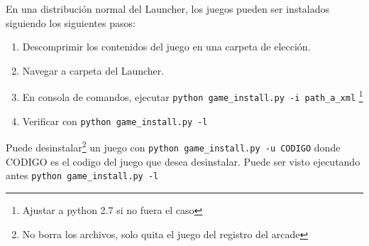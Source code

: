 \documentclass[language=spanish]{article}
\begin{document}
En una distribución normal del Launcher, los juegos pueden ser instalados siguiendo los siguientes pasos:\\
\begin{enumerate}
	\item Descomprimir los contenidos del juego en una carpeta de elección.
	\item Navegar a carpeta del Launcher.
	\item En consola de comandos, ejecutar {\tt python game\_install.py -i path\_a\_xml} \footnote{Ajustar a python 2.7 si no fuera el caso}
	\item Verificar con {\tt python game\_install.py -l}
\end{enumerate}
Puede desinstalar\footnote{No borra los archivos, solo quita el juego del registro del arcade} un juego con {\tt python game\_install.py -u CODIGO} donde CODIGO es el codigo del juego que desea desinstalar. Puede ser visto ejecutando antes {\tt python game\_install.py -l}
\end{document}

